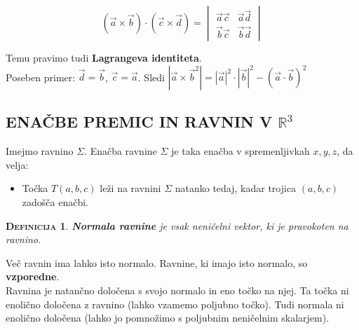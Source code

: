 \documentclass[a4paper,12pt]{article}
\newtheorem*{definicija}{\textsc{Definicija}}
\begin{document}
$$ (\vec{a}\times \vec{b})\cdot (\vec{c}\times \vec{d}) =
\begin{vmatrix}
	\vec{a}\vec{c} & \vec{a}\vec{d} \\
	\vec{b}\vec{c} & \vec{b}\vec{d}
\end{vmatrix} $$

Temu pravimo tudi \textbf{Lagrangeva identiteta}. \\

Poseben primer: $\vec{d}=\vec{b}$, $\vec{c}=\vec{a}$. Sledi $|\vec{a}\times \vec{b}^2|=|\vec{a}|^2 \cdot |\vec{b}|^2-(\vec{a}\cdot \vec{b})^2$

\newpage

\begin{center}
\section{ENAČBE PREMIC IN RAVNIN V $\mathbb{R}^3$}
\end{center}

Imejmo ravnino $\Sigma$. Enačba ravnine $\Sigma$ je taka enačba v spremenljivkah $x,y,z$, da velja: \\

\begin{itemize}
\item Točka $T(a,b,c)$ leži na ravnini $\Sigma$ natanko tedaj, kadar trojica $(a,b,c)$ zadošča enačbi.\\
\end{itemize}

\begin{definicija}
\textbf{Normala ravnine} je vsak neničelni vektor, ki je pravokoten na ravnino.\\
\end{definicija}
 
Več ravnin ima lahko isto normalo. Ravnine, ki imajo isto normalo, so \textbf{vzporedne}. \\

Ravnina je natančno določena s svojo normalo in eno točko na njej. Ta točka ni enolično določena z ravnino (lahko vzamemo poljubno točko). Tudi normala ni enolično določena (lahko jo pomnožimo s poljubnim neničelnim skalarjem). \\
\end{document}
